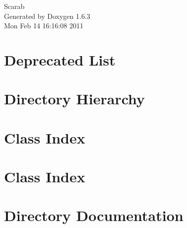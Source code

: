 \documentclass[a4paper]{book}
\begin{document}
\hypersetup{pageanchor=false}
\begin{titlepage}
\vspace*{7cm}
\begin{center}
{\Large Scarab }\\
\vspace*{1cm}
{\large Generated by Doxygen 1.6.3}\\
\vspace*{0.5cm}
{\small Mon Feb 14 16:16:08 2011}\\
\end{center}
\end{titlepage}
\clearemptydoublepage
{}
\tableofcontents
\clearemptydoublepage
{}
\hypersetup{pageanchor=true}
\chapter{Deprecated List}
\label{deprecated}
\hypertarget{deprecated}{}

\chapter{Directory Hierarchy}

\chapter{Class Index}

\chapter{Class Index}

\chapter{Directory Documentation}





















\end{document}
